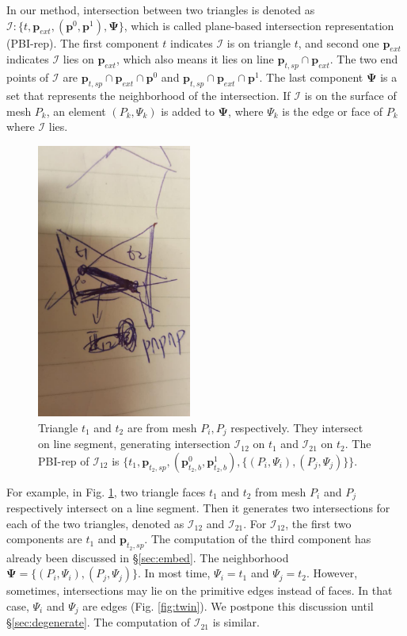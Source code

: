 \documentclass[10pt,journal,compsoc]{IEEEtran}
\begin{document}
In our method, intersection between two triangles is denoted as $\bm{\mathcal{I}}\colon\{t, \bm{p}_{ext}, (\bm{p}^0, \bm{p}^1),\bm{\Psi}\}$, which is called plane-based intersection representation (PBI-rep). The first component $t$ indicates $\bm{\mathcal{I}}$ is on triangle $t$, and second one $\bm{p}_{ext}$ indicates $\bm{\mathcal{I}}$ lies on $\bm{p}_{ext}$, which also means it lies on line $\bm{p}_{t, sp} \cap \bm{p}_{ext}$. The two end points of $\bm{\mathcal{I}}$ are $\bm{p}_{t, sp} \cap \bm{p}_{ext}\cap\bm{p}^0$ and $\bm{p}_{t, sp} \cap \bm{p}_{ext}\cap\bm{p}^1$. The last component $\bm{\Psi}$ is a set that represents the neighborhood of the intersection. If $\bm{\mathcal{I}}$ is on the surface of mesh $P_k$, an element $(P_{k}, \Psi_{k})$ is added to $\bm{\Psi}$, where $\Psi_{k}$ is the edge or face of $P_k$ where $\bm{\mathcal{I}}$ lies.

\begin{figure}[t]
\centering
\includegraphics[width=2in]{pbi}
\caption{Triangle $t_1$ and $t_2$ are from mesh $P_i, P_j$ respectively. They intersect on line segment, generating intersection $\bm{\mathcal{I}}_{12}$ on $t_1$ and $\bm{\mathcal{I}}_{21}$ on $t_2$. The PBI-rep of $\bm{\mathcal{I}}_{12}$ is $\{t_1, \bm{p}_{t_2, sp}, (\bm{p}_{t_2, b}^0, \bm{p}_{t_2, b}^1),\{(P_i, \Psi_i), (P_j, \Psi_j)\}\}$.}
\label{fig:pbi}
\end{figure}

For example, in Fig. \ref{fig:pbi}, two triangle faces $t_1$ and $t_2$ from mesh $P_i$ and $P_j$ respectively intersect on a line segment. Then it generates two intersections for each of the two triangles, denoted as ${\bm{\mathcal{I}}}_{12}$ and ${\bm{\mathcal{I}}}_{21}$. For ${\bm{\mathcal{I}}}_{12}$, the first two components are $t_1$ and $\bm{p}_{t_2, sp}$. The computation of the third component has already been discussed in \S\ref{sec:embed}. The neighborhood $\bm{\Psi} = \{(P_i, \Psi_i), (P_j, \Psi_j)\}$. In most time, $\Psi_i=t_1$ and $\Psi_j=t_2$. However, sometimes, intersections may lie on the primitive edges instead of faces. In that case, $\Psi_i$ and $\Psi_j$ are edges (Fig. \ref{fig:twin}). We postpone this discussion until \S\ref{sec:degenerate}. The computation of ${\bm{\mathcal{I}}}_{21}$ is similar.
\end{document}
